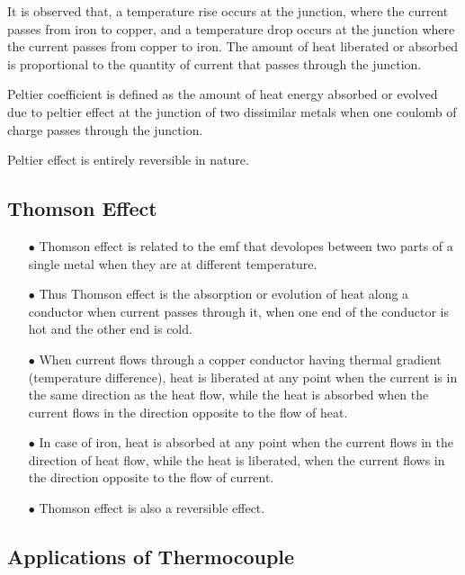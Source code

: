 It is observed that, a temperature rise occurs at the junction, where the current passes from iron to copper, and a temperature drop occurs at the junction where the current passes from copper to iron. The amount of heat liberated or absorbed is proportional to the quantity of current that passes through the junction.

Peltier coefficient is defined as the amount of heat energy absorbed or evolved due to peltier effect at the junction of two dissimilar metals when one coulomb of charge passes through the junction.

Peltier effect is entirely reversible in nature.

\vfill\eject

\subsection{Thomson Effect}\label{sec8.13.3}
\begin{itemize}
\item[$\bullet$] Thomson effect is related to the emf that devolopes between two parts of a single metal when they are at different temperature.

\item[$\bullet$] Thus Thomson effect is the absorption or evolution of heat along a conductor when current passes through it, when one end of the conductor is hot and the other end is cold.

\item[$\bullet$] When current flows through a copper conductor having thermal gradient (temperature difference), heat is liberated at any point when the current is in the same direction as the heat flow, while the heat is absorbed when the current flows in the direction opposite to the flow of heat.

\item[$\bullet$] In case of iron, heat is absorbed at any point when the current flows in the direction of heat flow, while the heat is liberated, when the current flows in the direction opposite to the flow of current.

\item[$\bullet$] Thomson effect is also a reversible effect.
\end{itemize}

\subsection{Applications of Thermocouple}\label{sec8.13.4}

